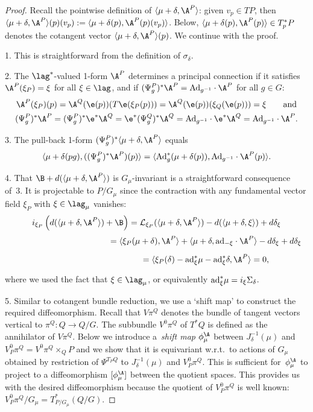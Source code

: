 \begin{proof} Recall the pointwise def\/inition of $\langle \mu +\delta,\A^P\rangle$: given $v_p\in TP$, then $\langle \mu +\delta,\A^P\rangle(p)(v_p) := \langle  \mu +\delta(p),\A^P(p)(v_p)\rangle$. Below, $\langle \mu +\delta(p),\A^P(p)\rangle\in T^*_pP$ denotes the cotangent vector $\langle \mu +\delta,\A^P\rangle(p)$. We continue with the proof.

1. This is straightforward from the def\/inition of $\sigma_\delta$.

 2. The $\lag^*$-valued 1-form $\A^P$ determines a principal connection if it satisf\/ies $\A^P(\xi_P)=\xi$ for all $\xi\in\lag$, and if $(\Psi^P_g)^*\A^P={\rm Ad}_{g^{-1}}\cdot \A^P$ for all $g\in G$:
\begin{gather*}
  \A^P(\xi_P)(p) = \A^Q(\e(p))(T\e(\xi_P(p)))= \A^Q(\e(p))(\xi_Q(\e(p))) = \xi \qquad \mbox{and}\\
 (\Psi^P_g)^*\A^P= (\Psi^P_g)^*\e^*\A^Q = \e^* (\Psi^Q_g)^*\A^Q = {\rm Ad}_{g^{-1}}\cdot \e^*\A^Q ={\rm Ad}_{g^{-1}}\cdot\A^P.
\end{gather*}

3. The pull-back 1-form $(\Psi^P_g)^*\langle \mu +\delta,\A^P\rangle$ equals
\[
 \langle \mu +\delta(pg),((\Psi^P_g)^*\A^P)(p)\rangle=\langle {\rm Ad}_g^*( \mu +\delta(p)),{\rm Ad}_{g^{-1}}\cdot\A^P(p)\rangle.
\]

 4. That $\B + d(\langle \mu +\delta,\A^P\rangle)$ is $G_\mu$-invariant is a straightforward consequence of~3. It is projectable to $P/G_\mu$ since the contraction with any fundamental vector f\/ield $\xi_P$ with $\xi\in\lag_\mu$ vanishes:
    \begin{gather*}
 i_{\xi_P}\left(d(\langle \mu +\delta,\A^P\rangle)+\B\right)   = {\cal L}_{\xi_P}(\langle \mu +\delta,\A^P\rangle)- d(\langle\mu+\delta,\xi\rangle) + d\delta_{\xi}  \\
 \phantom{i_{\xi_P}\left(d(\langle \mu +\delta,\A^P\rangle)+\B\right)  }{}
 = \langle \xi_P(\mu+\delta),\A^P\rangle + \langle\mu+\delta,{\rm ad}_{-\xi}\cdot\A^P\rangle - d\delta_\xi  + d\delta_{\xi}\\
 \phantom{i_{\xi_P}\left(d(\langle \mu +\delta,\A^P\rangle)+\B\right)  }{}
  = \langle \xi_P(\delta)-{\rm ad}^*_\xi\mu-{\rm ad}^*_\xi \delta,\A^P\rangle =0,
\end{gather*}
where we used the fact that $\xi\in\lag_\mu$, or equivalently ${\rm ad}^*_\xi\mu = i_\xi\Sigma_\delta$.

 5. Similar to cotangent bundle reduction, we use a `shift map' to construct the required dif\/feomorphism. Recall that $V\pi^Q$ denotes the bundle of tangent vectors vertical to $\pi^Q:Q\to Q/G$. The subbundle $V^0\pi^Q$ of $T^*Q$ is def\/ined as the annihilator of $V\pi^Q$. Below we introduce a~{\em shift map} $\phi_\mu^{\A}$ between $J^{-1}_\delta(\mu)$ and $V^0_P\pi^Q = V^0\pi^Q\times_Q P$ and we show that it is equivariant w.r.t.\ to actions of $G_\mu$ obtained by restriction of $\Psi^{T_PQ}$ to $J_\delta^{-1}(\mu)$ and $V^0_P\pi^Q$. This is suf\/f\/icient for~$\phi_\mu^{\A}$ to project to a dif\/feomorphism $[\phi_\mu^{\A}]$ between the quotient spaces. This provides us with the desired dif\/feomorphism because the quotient of $V^0_P\pi^Q$ is well known: $V^0_P\pi^Q/G_\mu = T^*_{P/G_\mu}(Q/G)$.


\end{proof}
